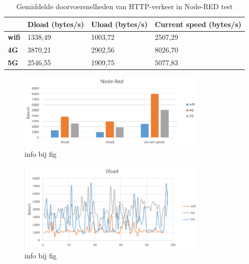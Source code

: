 \begin{table}[h]
    \caption{Gemiddelde doorvoersnelheden van HTTP-verkeer in Node-RED test}
    \begin{tabular}{l l l l}
        \cline{2-4}
        & \textbf{Dload (bytes/s)} & \textbf{Uload (bytes/s)} & \textbf{Current speed (bytes/s)} \\ \hline
        \multicolumn{1}{l}{\textbf{wifi}}       & 1338,49                     & 1003,72                    & 2507,29                             \\ \hline       
        \multicolumn{1}{l}{\textbf{4G}} & 3870,21                     & 2902,56                    & 8026,70                             \\ \hline
        \multicolumn{1}{l}{\textbf{5G}} & 2546,55                     & 1909,75                    & 5077,83                             \\ \hline
    \end{tabular}
    
\end{table}
\begin{figure}
    \includegraphics[width=0.8\textwidth]{../graphics/Node-red_grafiek.png}
    \caption[grafiek van nodered test]{\label{fig:noderedgem}info bij fig}
\end{figure}
\begin{figure}

    \includegraphics[width=0.8\textwidth]{../graphics/node-red_dload_grafiek.png}
    \caption[grafiek van dload nodered test]{\label{fig:nodereddload}info bij fig}
\end{figure}
